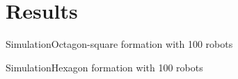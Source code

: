 \documentclass[10pt]{beamer}
\begin{document}
\section{Results}
\begin{frame}{Simulation}{Octagon-square formation with 100 robots}
  \begin{center}
  \end{center}
\end{frame}
\begin{frame}{Simulation}{Hexagon formation with 100 robots}
  \begin{center}
  \end{center}
\end{frame}
\end{document}
